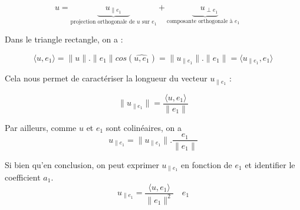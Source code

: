 \begin{equation}
u = \underbrace{\quad u_{\| e_1} \quad}_{\text{projection orthogonale de $u$ sur $e_1$}} + \underbrace{\quad u_{\perp e_1}}_{\text{composante orthogonale à $e_1$ }} \quad
\end{equation}

\begin{center} 
\end{center} 

Dans le triangle rectangle, on a :

\begin{equation}
\langle u , e_1 \rangle   = \|u\|.\|e_1\|cos(\widehat{u,e_1})  =  \|u_{\|e_1}\|.\|e_1\| = \langle u_{\|e_1},e_1 \rangle
\end{equation}


Cela nous permet de caractériser la longueur du vecteur $u_{\|e_1}$ : 

\begin{equation}
\|u_{\|e_1}\|  = \frac{\langle u , e_1 \rangle}{\|e_1\|}
\end{equation}

Par ailleurs, comme $u$ et $e_1$ sont colinéaires, on a 
\begin{equation}
u_{\|e_1} = \|u_{\|e_1}\| . \frac{e_1}{\|e_1\|}
\end{equation}

Si bien qu'en conclusion, on peut exprimer $u_{\|e_1}$ en fonction de $e_1$ et identifier le coefficient $a_1$.
\begin{equation}
u_{\|e_1} = \frac{\langle u , e_1 \rangle}{\|e_1\|^2} \quad e_1
\end{equation}


